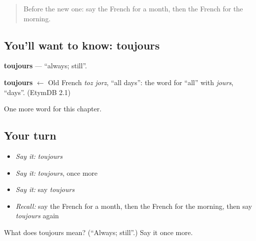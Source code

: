 \begin{quote}
Before the new one: say the French for a month, then the French for the morning.
\end{quote}

\subsection*{You'll want to know: toujours}
\textbf{toujours} — \textquotedblleft{}always; still\textquotedblright{}.

\begin{cousinweb}
\textbf{toujours} $\leftarrow$ Old French \emph{toz jorz}, \textquotedblleft{}all days\textquotedblright{}: the word for \textquotedblleft{}all\textquotedblright{} with \emph{jours}, \textquotedblleft{}days\textquotedblright{}. (EtymDB 2.1)
\end{cousinweb}

\begin{grammarlens}[title={What you've built}]
One more word for this chapter.
\end{grammarlens}

\subsection*{Your turn}
\begin{itemize}
\raggedright
  \item \emph{Say it:} \emph{toujours}
  \item \emph{Say it:} \emph{toujours}, once more
  \item \emph{Say it:} say \emph{toujours}
  \item \emph{Recall:} say the French for a month, then the French for the morning, then say \emph{toujours} again
\end{itemize}

\begin{tcolorbox}[breakable,colback=teal!4,colframe=teal!35!black,title={Before you move on}]
What does toujours mean? (\textquotedblleft{}Always; still\textquotedblright{}.) Say it once more.
\end{tcolorbox}
